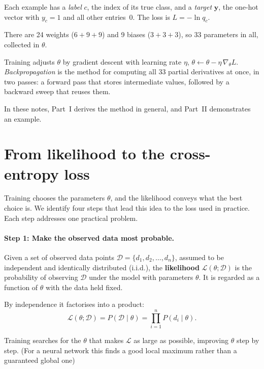 \documentclass[12pt]{article}
\numberwithin{equation}{section} %
\newcommand{\vc}[1]{\symbf{#1}}
\begin{document}
Each example has a
\emph{label} $c$, the index of its true class, and
a \emph{target} $\vc{y}$, the one-hot vector with
$y_c=1$ and all other entries~0. The loss is
$L=-\ln q_c$.

There are 24 weights ($6+9+9$) and 9 biases ($3+3+3$),
so 33 parameters in all, collected in $\theta$.

Training adjusts $\theta$ by gradient descent with
learning rate $\eta$, $\theta\leftarrow\theta-\eta\,\nabla_{\theta}L$.
\emph{Backpropagation} is the method for computing
all 33 partial derivatives at once, in two passes:
a forward pass that stores intermediate values,
followed by a backward sweep that reuses them.

In these notes, Part~I derives the method in general,
and Part~II demonstrates an example.

\section{From likelihood to the cross-entropy loss}
\label{sec:likelihood}

Training chooses the parameters $\theta$, and the
likelihood conveys what the best choice is. We identify
four steps that lead this idea to the loss
used in practice. Each step addresses one practical
problem.

\paragraph{Step 1: Make the observed data most probable.}
Given a set of observed data points
$\mathcal{D}=\{d_1,d_2,\dots,d_n\}$, assumed to be
independent and identically distributed (i.i.d.),
the \textbf{likelihood}
$\mathcal{L}(\theta;\mathcal{D})$ is the probability
of observing $\mathcal{D}$ under the model with
parameters $\theta$. It is regarded as a function of
$\theta$ with the data held fixed.

By independence it factorises into a product:
\begin{equation}\label{eq:likelihood}
  \mathcal{L}(\theta;\mathcal{D})=P(\mathcal{D}\mid\theta)
    =\prod_{i=1}^{n}P(d_i\mid\theta).
\end{equation}

Training searches for the $\theta$ that makes
$\mathcal{L}$ as large as possible, improving
$\theta$ step by step. (For a neural network this
finds a good local maximum rather than a
guaranteed global one)
\end{document}
